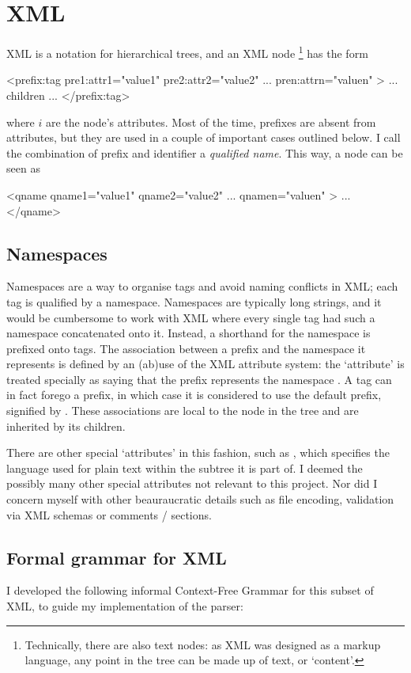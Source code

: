 \section{XML}
XML is a notation for hierarchical trees, and an XML node \footnote{Technically, there are also text nodes: as XML was designed as a markup language, any point in the tree can be made up of text, or `content'.} has the form
\begin{xml}
<prefix:tag pre1:attr1="value1" pre2:attr2="value2" ... pren:attrn="valuen" >
   ... children ...
</prefix:tag>
\end{xml}
where \(i\) are the node's attributes. Most of the time, prefixes are absent from attributes, but they are used in a couple of important cases outlined below. I call the combination of prefix and identifier a \emph{qualified name}. This way, a node can be seen as
\begin{xml}
<qname qname1="value1" qname2="value2" ... qnamen="valuen" >
  ...
</qname>
\end{xml}

\subsection{Namespaces}
Namespaces are a way to organise tags and avoid naming conflicts in XML; each tag is qualified by a namespace. Namespaces are typically long strings, and it would be cumbersome to work with XML where every single tag had such a namespace concatenated onto it. Instead, a shorthand for the namespace is prefixed onto tags. The association between a prefix and the namespace it represents is defined by an (ab)use of the XML attribute system: the `attribute'  is treated specially as saying that the prefix  represents the namespace . A tag can in fact forego a prefix, in which case it is considered to use the default prefix, signified by . These associations are local to the node in the tree and are inherited by its children.

There are other special `attributes' in this fashion, such as , which specifies the language used for plain text within the subtree it is part of. I deemed the possibly many other special attributes not relevant to this project. Nor did I concern myself with other beauraucratic details such as file encoding, validation via XML schemas or comments /  sections.

\subsection{Formal grammar for XML}
I developed the following informal Context-Free Grammar for this subset of XML, to guide my implementation of the parser:

